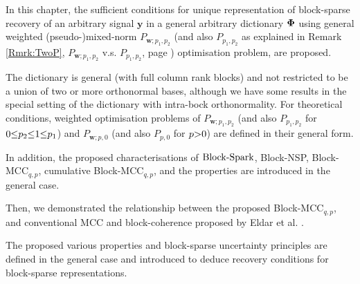 In this chapter, the sufficient conditions for unique representation of block-sparse recovery of an arbitrary signal $\boldsymbol{y}$ in a general arbitrary dictionary $\boldsymbol{\Phi}$ using general weighted (pseudo-)mixed-norm $P_{\boldsymbol{w};p_1,p_2}$ (and also $P_{p_1,p_2}$ as explained in Remark \ref{Rmrk:TwoP}, $P_{\boldsymbol{w};p_1,p_2}$ v.s. $P_{p_1,p_2}$, page \pageref{Rmrk:TwoP}) optimisation problem, are proposed. 

The dictionary is general (with full column rank blocks) and not restricted to be a union of two or more orthonormal bases, although we have some results in the special setting of the dictionary 
with intra-bock orthonormality. 
For theoretical conditions, weighted optimisation problems of $P_{\boldsymbol{w};p_1,p_2}$ (and also $P_{p_1,p_2}$ for $0 {\leq} p_2 {\leq} 1 {\leq} p_1$) and   
$P_{\boldsymbol{w};p,0}$ (and also $P_{p,0}$ for $p {>} 0$) are defined in their general form.


In addition, the proposed characterisations of $\mathrm{Block\text{{-}}Spark}$, 
Block-NSP, 
Block-MCC$_{q,p}$, 
cumulative Block-MCC$_{q,p}$, 
and the properties 
are introduced in the general case.

Then, we demonstrated the relationship between the proposed Block-MCC$_{q,p}$, and conventional MCC and block-coherence proposed by Eldar et al. \cite{Eldar2009b,Eldar2010b,Eldar2010}.

The proposed various properties and block-sparse uncertainty principles 
are defined in the general case and introduced to deduce recovery conditions for block-sparse representations.

